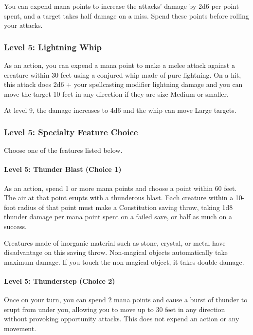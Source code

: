 \documentclass[12pt,letterpaper,twocolumn,openany,nodeprecatedcode,bg=none]{dndbook}
\begin{document}
You can expend mana points to increase the attacks' damage by 2d6 per
point spent, and a target takes half damage on a miss. Spend these
points before rolling your attacks.

\subsubsection{Level 5: Lightning Whip}\label{level-5-lightning-whip}

As an action, you can expend a mana point to make a melee attack against
a creature within 30 feet using a conjured whip made of pure lightning.
On a hit, this attack does 2d6 + your spellcasting modifier lightning
damage and you can move the target 10 feet in any direction if they are
size Medium or smaller.

At level 9, the damage increases to 4d6 and the whip can move Large
targets.

\subsubsection{Level 5: Specialty Feature
Choice}\label{level-5-specialty-feature-choice-2}

Choose one of the features listed below.

\paragraph{Level 5: Thunder Blast (Choice
1)}\label{level-5-thunder-blast-choice-1}

As an action, spend 1 or more mana points and choose a point within 60
feet. The air at that point erupts with a thunderous blast. Each
creature within a 10-foot radius of that point must make a Constitution
saving throw, taking 1d8 thunder damage per mana point spent on a failed
save, or half as much on a success.

Creatures made of inorganic material such as stone, crystal, or metal
have disadvantage on this saving throw. Non-magical objects
automatically take maximum damage. If you touch the non-magical object,
it takes double damage.

\paragraph{Level 5: Thunderstep (Choice
2)}\label{level-5-thunderstep-choice-2}

Once on your turn, you can spend 2 mana points and cause a burst of
thunder to erupt from under you, allowing you to move up to 30 feet in
any direction without provoking opportunity attacks. This does not
expend an action or any movement.
\end{document}
